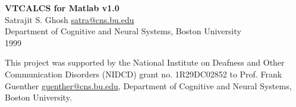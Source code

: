 \begin{titlepage}

\begin{center}
\vspace*{8 cm}

\Large{\bf{VTCALCS for Matlab v1.0}}
\\

\normalsize \vspace{24.3 mm} Satrajit S. Ghosh
\href{mailto:satra@cns.bu.edu}{satra@cns.bu.edu}\\ Department of
Cognitive and Neural Systems, Boston University
\\ 1999 \\
\vspace*{6 cm}
\end{center}

This project was supported by the National Institute on Deafness
and Other Communication Disorders (NIDCD) grant no. 1R29DC02852 to
Prof. Frank Guenther
\href{mailto:guenther@cns.bu.edu}{guenther@cns.bu.edu}, Department
of Cognitive and Neural Systems, Boston University.
\end{titlepage}
